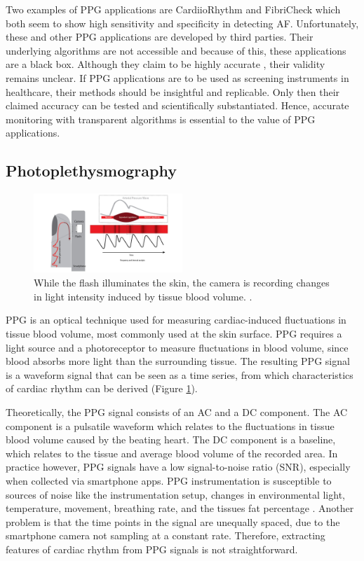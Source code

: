 \documentclass[twocolumn]{bmcart}%
\begin{document}
Two examples of PPG applications are CardiioRhythm \cite{ChanPak-Hei} and FibriCheck \cite{Proesmans2019} which both seem to show high sensitivity and specificity in detecting AF.
Unfortunately, these and other PPG applications are developed by third parties.
Their underlying algorithms are not accessible and because of this, these applications are a black box. 
Although they claim to be highly accurate \cite{ChanPak-Hei, Matsumura2013, Poh2018}, their validity remains unclear.  
If PPG applications are to be used as screening instruments in healthcare, their methods should be insightful and replicable. 
Only then their claimed accuracy can be tested and scientifically substantiated. 
Hence, accurate monitoring with transparent algorithms is essential to the value of PPG applications.

\subsection*{Photoplethysmography}
\begin{figure}[]
\includegraphics[width=0.5\textwidth]{PPGprinciple.jpg} 
\caption{
 While the flash illuminates the skin, the camera is recording changes in light intensity induced by tissue blood volume. \cite{Vandenberk2017}.}
 \label{fig:ppg}
\end{figure}
PPG is an optical technique used for measuring cardiac-induced fluctuations in tissue blood volume, most commonly used at the skin surface. 
PPG requires a light source and a photoreceptor to measure fluctuations in blood volume, since blood absorbs more light than the surrounding tissue.  
The resulting PPG signal is a waveform signal that can be seen as a time series, from which characteristics of cardiac rhythm can be derived (Figure \ref{fig:ppg}). 

Theoretically, the PPG signal consists of an AC and a DC component. 
The AC component is a pulsatile waveform which relates to the fluctuations in tissue blood volume caused by the beating heart. 
The DC component is a baseline, which relates to the tissue and average blood volume of the recorded area. 
In practice however, PPG signals have a low signal-to-noise ratio (SNR), especially when collected via smartphone apps. 
PPG instrumentation is susceptible to sources of noise like the instrumentation setup, changes in environmental light, temperature, movement, breathing rate, and the tissues fat percentage \cite{Moraes2018}. 
Another problem is that the time points in the signal are unequally spaced, due to the smartphone camera not sampling at a constant rate. 
Therefore, extracting features of cardiac rhythm from PPG signals is not straightforward.
\end{document}
